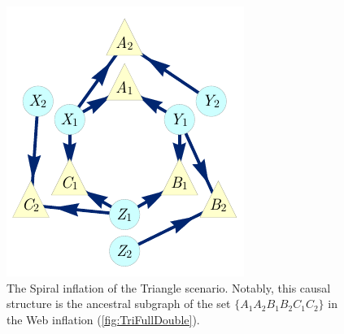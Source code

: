 \documentclass[aps,english,10pt,superscriptaddress,onecolumn,twoside,longbibliography,pra,floatfix,fleqn,nofootinbib]{revtex4-1}
\theoremstyle{definition}
\begin{document}
\begin{figure}[h]
\begin{minipage}[t]{0.3\linewidth}
\centering
\includegraphics[scale=1]{TriDagSub222fixedcoordALT.pdf}
\caption{The Spiral inflation of the Triangle scenario.  Notably, this causal structure is the ancestral subgraph of the set $\{ A_1 A_2 B_1 B_2 C_1 C_2\}$ in the Web inflation (\cref{fig:TriFullDouble}).}
 \label{fig:Tri222}
\end{minipage}
\end{figure}
\end{document}

